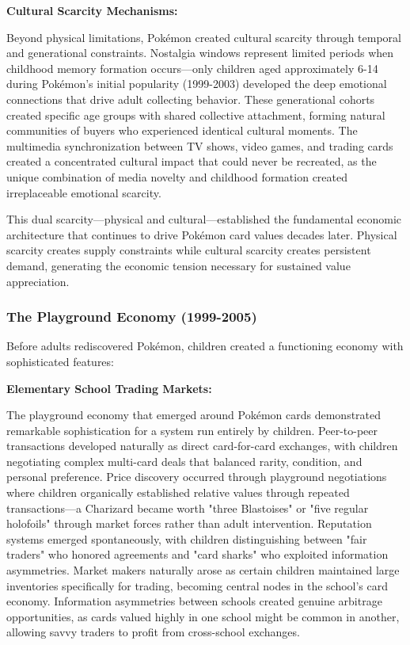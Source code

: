 \documentclass[11pt,oneside]{book}
\begin{document}
{{{{{{\textbf{Cultural Scarcity Mechanisms:}

Beyond physical limitations, Pokémon created cultural scarcity through temporal and generational constraints. Nostalgia windows represent limited periods when childhood memory formation occurs—only children aged approximately 6-14 during Pokémon's initial popularity (1999-2003) developed the deep emotional connections that drive adult collecting behavior. These generational cohorts created specific age groups with shared collective attachment, forming natural communities of buyers who experienced identical cultural moments. The multimedia synchronization between TV shows, video games, and trading cards created a concentrated cultural impact that could never be recreated, as the unique combination of media novelty and childhood formation created irreplaceable emotional scarcity.

This dual scarcity—physical and cultural—established the fundamental economic architecture that continues to drive Pokémon card values decades later. Physical scarcity creates supply constraints while cultural scarcity creates persistent demand, generating the economic tension necessary for sustained value appreciation.

\subsubsection{The Playground Economy (1999-2005)}

Before adults rediscovered Pokémon, children created a functioning economy with sophisticated features:

\textbf{Elementary School Trading Markets:}

The playground economy that emerged around Pokémon cards demonstrated remarkable sophistication for a system run entirely by children. Peer-to-peer transactions developed naturally as direct card-for-card exchanges, with children negotiating complex multi-card deals that balanced rarity, condition, and personal preference. Price discovery occurred through playground negotiations where children organically established relative values through repeated transactions—a Charizard became worth "three Blastoises" or "five regular holofoils" through market forces rather than adult intervention. Reputation systems emerged spontaneously, with children distinguishing between "fair traders" who honored agreements and "card sharks" who exploited information asymmetries. Market makers naturally arose as certain children maintained large inventories specifically for trading, becoming central nodes in the school's card economy. Information asymmetries between schools created genuine arbitrage opportunities, as cards valued highly in one school might be common in another, allowing savvy traders to profit from cross-school exchanges.

}}}}}}
\end{document}
